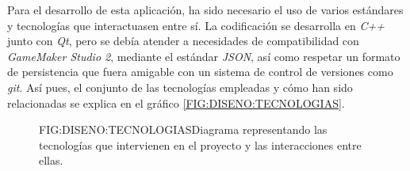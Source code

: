 Para el desarrollo de esta aplicación, ha sido necesario el uso de varios estándares y tecnologías que interactuasen entre sí. La codificación se desarrolla en \textit{C++} junto con \textit{Qt}, pero se debía atender a necesidades de compatibilidad con \textit{GameMaker Studio 2}, mediante el estándar \textit{JSON}, así como respetar un formato de persistencia que fuera amigable con un sistema de control de versiones como \textit{git}.
Así pues, el conjunto de las tecnologías empleadas y cómo han sido relacionadas se explica en el gráfico \ref{FIG:DISENO:TECNOLOGIAS}.

\begin{figure}{FIG:DISENO:TECNOLOGIAS}{Diagrama representando las tecnologías que intervienen en el proyecto y las interacciones entre ellas.}
\end{figure}
